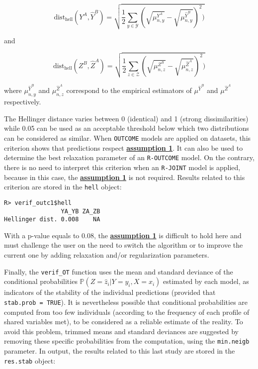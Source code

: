 \[
\text{dist}_{\text{hell}} (Y^A,\widehat{Y}^B)= \sqrt{\frac{1}{2} \sum_{y\in \mathcal{Y}}\left(\sqrt{\mu_{n,y}^{Y^A}}- \sqrt{\mu_{n,y}^{\widehat{Y}^B}}\right)^2 )}
\]

and

\[
\text{dist}_{\text{hell}} (Z^B,\widehat{Z}^A)= \sqrt{\frac{1}{2} \sum_{z\in \mathcal{Z}}\left(\sqrt{\mu_{n,z}^{Z^B}}- \sqrt{\mu_{n,z}^{\widehat{Z}^A}}\right)^2 )}
\]

where \(\mu_{n,y}^{\widehat{Y}^B}\) and \(\mu_{n,z}^{\widehat{Z}^A}\) correspond to the empirical estimators of \(\mu^{\widehat{Y}^B}\) and \(\mu^{\widehat{Z}^A}\) respectively.

The Hellinger distance varies between 0 (identical) and 1 (strong dissimilarities) while 0.05 can be used as an acceptable threshold below which two distributions can be considered as similar. When \texttt{OUTCOME} models are applied on datasets, this criterion shows that predictions respect \protect\hyperlink{optt}{\textbf{assumption 1}}. It can also be used to determine the best relaxation parameter of an \texttt{R-OUTCOME} model. On the contrary, there is no need to interpret this criterion when an \texttt{R-JOINT} model is applied, because in this case, the \protect\hyperlink{optt}{\textbf{assumption 1}} is not required. Results related to this criterion are stored in the \texttt{hell} object:

\begin{verbatim}
R> verif_outc1$hell
                YA_YB ZA_ZB
Hellinger dist. 0.008    NA
\end{verbatim}

With a p-value equals to \(0.08\), the \protect\hyperlink{optt}{\textbf{assumption 1}} is difficult to hold here and must challenge the user on the need to switch the algorithm or to improve the current one by adding relaxation and/or regularization parameters.

Finally, the \texttt{verif\_OT} function uses the mean and standard deviance of the conditional probabilities \(\mathbb{P}(Z=\hat{z}_i|Y=y_i,X=x_i)\) estimated by each model, as indicators of the stability of the individual predictions (provided that \texttt{stab.prob\ =\ TRUE}). It is nevertheless possible that conditional probabilities are computed from too few individuals (according to the frequency of each profile of shared variables met), to be considered as a reliable estimate of the reality. To avoid this problem, trimmed means and standard deviances are suggested by removing these specific probabilities from the computation, using the \texttt{min.neigb} parameter. In output, the results related to this last study are stored in the \texttt{res.stab} object:

